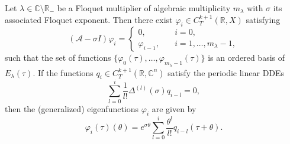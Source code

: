 \documentclass[english]{myarticle}
\begin{document}
\begin{sloppypar}
\begin{theorem} \label{thm:eigenfunctions}
Let $\lambda \in \mathbb{C} \setminus \mathbb{R}_{-}$ be a Floquet multiplier of algebraic multiplicity $m_\lambda$ with $\sigma$ its associated Floquet exponent. Then there exist $\varphi_i \in C_T^{k+1}(\mathbb{R},X)$ satisfying
\begin{equation} \label{eq:ODEeig2}
    ( \mathcal{A} - \sigma I)\varphi_i=
    \begin{cases}
    0, \quad &i = 0,\\
    \varphi_{i-1}, \quad &i=1,\dots,m_\lambda-1,
    \end{cases}
\end{equation}
such that the set of functions $\{ \varphi_0(\tau),\dots,\varphi_{m_\lambda - 1}(\tau) \}$ is an ordered basis of $E_\lambda(\tau)$.  If the functions $q_i \in C_T^{k+1}(\mathbb{R},\mathbb{C}^n)$ satisfy the periodic linear DDEs
\begin{equation} \label{eq:q_i}
    \sum_{l=0}^i \frac{1}{l!}\Delta^{(l)}(\sigma)  q_{i-l} = 0,
\end{equation}
then the (generalized) eigenfunctions $\varphi_i$ are given by
\begin{equation} \label{eq:varphi_i}
    \varphi_i(\tau)(\theta) = e^{\sigma \theta} \sum_{l=0}^{i} \frac{\theta^l}{l!} q_{i-l}(\tau + \theta).
\end{equation}
\end{theorem}


\end{sloppypar}
\end{document}
